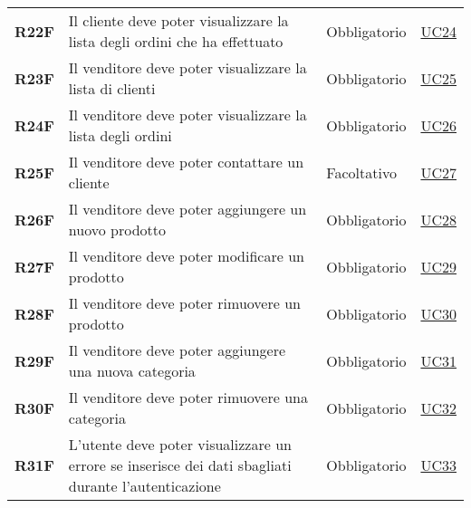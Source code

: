 \begin{center}
\begin{longtable}[!h]{p{50px} p{245px} p{75px} p{50px}}
        \textbf{R22F}                         & Il cliente deve poter visualizzare la lista degli ordini che ha effettuato                          & Obbligatorio             & \hyperref[sec:UC24]{UC24}                      \\
        \textbf{R23F}                         & Il venditore deve poter visualizzare la lista di clienti                                            & Obbligatorio             & \hyperref[sec:UC25]{UC25}                      \\
        \textbf{R24F}                         & Il venditore deve poter visualizzare la lista degli ordini                                          & Obbligatorio             & \hyperref[sec:UC26]{UC26}                      \\
        \textbf{R25F}                         & Il venditore deve poter contattare un cliente                                                       & Facoltativo              & \hyperref[sec:UC27]{UC27}                      \\
        \textbf{R26F}                         & Il venditore deve poter aggiungere un nuovo prodotto                                                & Obbligatorio             & \hyperref[sec:UC28]{UC28}                      \\
        \textbf{R27F}                         & Il venditore deve poter modificare un prodotto                                                      & Obbligatorio             & \hyperref[sec:UC29]{UC29}                      \\
        \textbf{R28F}                         & Il venditore deve poter rimuovere un prodotto                                                       & Obbligatorio             & \hyperref[sec:UC30]{UC30}                      \\
        \textbf{R29F}                         & Il venditore deve poter aggiungere una nuova categoria                                              & Obbligatorio             & \hyperref[sec:UC31]{UC31}                      \\
        \textbf{R30F}                         & Il venditore deve poter rimuovere una categoria                                                     & Obbligatorio             & \hyperref[sec:UC32]{UC32}                      \\
        \textbf{R31F}                         & L'utente deve poter visualizzare un errore se inserisce dei dati sbagliati durante l'autenticazione & Obbligatorio             & \hyperref[sec:UC33]{UC33}                      \\

\end{longtable}
\end{center}
